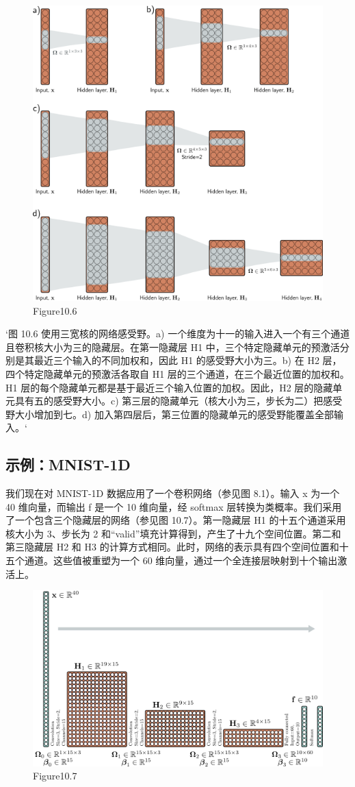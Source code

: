 \begin{figure}[h!]
\centering
\includegraphics[width=0.7\linewidth]{png/chapter10/ConvNetworkRF.png}
\caption{Figure10.6}
\end{figure}

`图 10.6 使用三宽核的网络感受野。a) 一个维度为十一的输入进入一个有三个通道且卷积核大小为三的隐藏层。在第一隐藏层 H1 中，三个特定隐藏单元的预激活分别是其最近三个输入的不同加权和，因此 H1 的感受野大小为三。b) 在 H2 层，四个特定隐藏单元的预激活各取自 H1 层的三个通道，在三个最近位置的加权和。H1 层的每个隐藏单元都是基于最近三个输入位置的加权。因此，H2 层的隐藏单元具有五的感受野大小。c) 第三层的隐藏单元（核大小为三，步长为二）把感受野大小增加到七。d) 加入第四层后，第三位置的隐藏单元的感受野能覆盖全部输入。`
\subsection{示例：MNIST-1D}
我们现在对 MNIST-1D 数据应用了一个卷积网络（参见图 8.1）。输入 x 为一个 40 维向量，而输出 f 是一个 10 维向量，经 softmax 层转换为类概率。我们采用了一个包含三个隐藏层的网络（参见图 10.7）。第一隐藏层 H1 的十五个通道采用核大小为 3、步长为 2 和“valid”填充计算得到，产生了十九个空间位置。第二和第三隐藏层 H2 和 H3 的计算方式相同。此时，网络的表示具有四个空间位置和十五个通道。这些值被重塑为一个 60 维向量，通过一个全连接层映射到十个输出激活上。


\begin{figure}[h!]
\centering
\includegraphics[width=0.7\linewidth]{png/chapter10/ConvDrawMNIST1D.png}
\caption{Figure10.7}
\end{figure}

